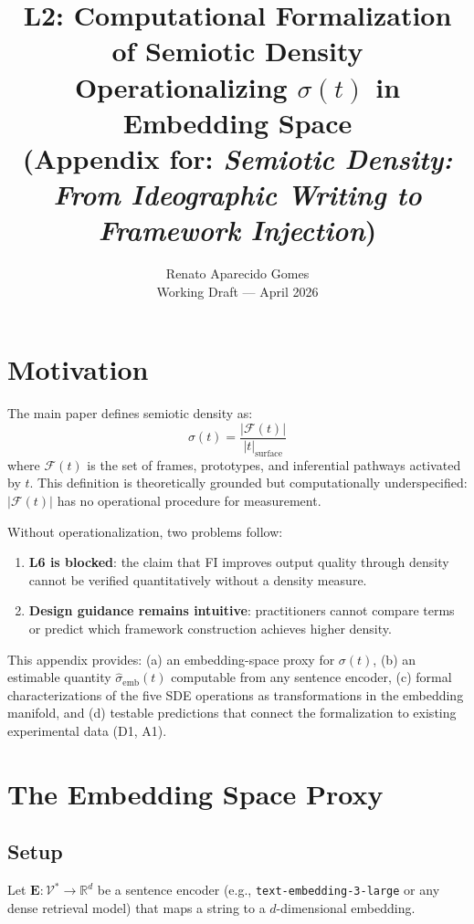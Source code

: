 \documentclass[11pt,a4paper]{article}
\title{%
  \textbf{L2: Computational Formalization of Semiotic Density}\\
  \large Operationalizing $\sigma(t)$ in Embedding Space\\
  \normalsize (Appendix for: \textit{Semiotic Density: From Ideographic Writing to Framework Injection})
}
\author{Renato Aparecido Gomes \\ \small Working Draft — April 2026}
\date{}
\begin{document}
\maketitle

\section*{Motivation}

The main paper defines semiotic density as:
\[
  \sigma(t) = \frac{|\mathcal{F}(t)|}{|t|_{\text{surface}}}
\]
where $\mathcal{F}(t)$ is the set of frames, prototypes, and inferential pathways
activated by $t$. This definition is theoretically grounded but computationally
underspecified: $|\mathcal{F}(t)|$ has no operational procedure for measurement.

Without operationalization, two problems follow:
\begin{enumerate}
  \item \textbf{L6 is blocked}: the claim that FI improves output quality through
    density cannot be verified quantitatively without a density measure.
  \item \textbf{Design guidance remains intuitive}: practitioners cannot compare
    terms or predict which framework construction achieves higher density.
\end{enumerate}

This appendix provides: (a) an embedding-space proxy for $\sigma(t)$, (b) an
estimable quantity $\hat{\sigma}_{\text{emb}}(t)$ computable from any
sentence encoder, (c) formal characterizations of the five SDE operations as
transformations in the embedding manifold, and (d) testable predictions that
connect the formalization to existing experimental data (D1, A1).

\section{The Embedding Space Proxy}
\label{sec:proxy}

\subsection{Setup}

Let $\mathbf{E}: \mathcal{V}^* \rightarrow \mathbb{R}^d$ be a sentence encoder
(e.g., \texttt{text-embedding-3-large} or any dense retrieval model) that maps
a string to a $d$-dimensional embedding.
\end{document}
